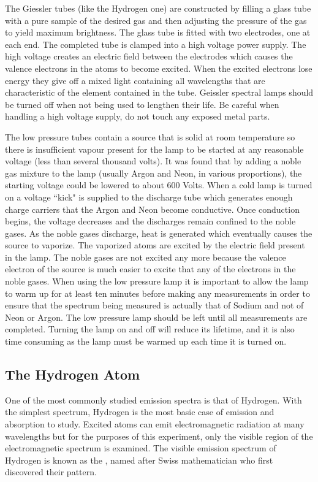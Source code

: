 \noindent The Giessler tubes (like the Hydrogen one) are constructed by filling a glass tube with a pure sample of the desired gas and then adjusting the pressure of the gas to yield maximum brightness. The glass tube is fitted with two electrodes, one at each end. The completed tube is clamped into a high voltage power supply. The high voltage creates an electric field between the electrodes which causes the valence electrons in the atoms to become excited. When the excited electrons lose energy they give off a mixed light containing all wavelengths that are characteristic of the element contained in the tube. Geissler spectral lamps should be turned off when not being used to lengthen their life. Be careful when handling a high voltage supply, do not touch any exposed metal parts.

\noindent The low pressure tubes contain a source that is solid at room temperature so there is insufficient vapour present for the lamp to be started at any reasonable voltage (less than several thousand volts). It was found that by adding a noble gas mixture to the lamp (usually Argon and Neon, in various proportions), the starting voltage could be lowered to about $600$ Volts. When a cold lamp is turned on a voltage ``kick" is supplied to the discharge tube which generates enough charge carriers that the Argon and Neon become conductive. Once conduction begins, the voltage decreases and the discharges remain confined to the noble gases. As the noble gases discharge, heat is generated which eventually causes the source to vaporize. The vaporized atoms are excited by the electric field present in the lamp. The noble gases are not excited any more because the valence electron of the source is much easier to excite that any of the electrons in the noble gases. When using the low pressure lamp it is important to allow the lamp to warm up for at least ten minutes before making any measurements in order to ensure that the spectrum being measured is actually that of Sodium and not of Neon or Argon. The low pressure lamp should be left until all measurements are completed. Turning the lamp on and off will reduce its lifetime, and it is also time consuming as the lamp must be warmed up each time it is turned on.

\subsection{The Hydrogen Atom}

One of the most commonly studied emission spectra is that of Hydrogen. With the simplest spectrum, Hydrogen is the most basic case of emission and absorption to study. Excited atoms can emit electromagnetic radiation at many wavelengths but for the purposes of this experiment, only the visible region of the electromagnetic spectrum is examined. The visible emission spectrum of Hydrogen is known as the , named after Swiss mathematician who first discovered their pattern.

